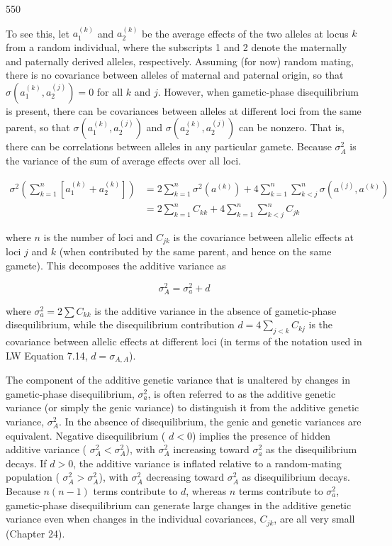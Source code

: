 \documentclass{article}
\begin{document}
550

To see this, let  $ a_1^{(k)} $ and  $ a_2^{(k)} $ be the average effects of the two alleles at locus  $ k $ from a random individual, where the subscripts 1 and 2 denote the maternally and paternally derived alleles, respectively. Assuming (for now) random mating, there is no covariance between alleles of maternal and paternal origin, so that  $ \sigma(a_1^{(k)}, a_2^{(j)}) = 0 $ for all  $ k $ and  $ j $. However, when gametic-phase disequilibrium is present, there can be covariances between alleles at different loci from the same parent, so that  $ \sigma(a_1^{(k)}, a_2^{(j)}) $ and  $ \sigma(a_2^{(k)}, a_2^{(j)}) $ can be nonzero. That is, there can be correlations between alleles in any particular gamete. Because  $ \sigma_A^2 $ is the variance of the sum of average effects over all loci.

\begin{equation}
\begin{align*}\sigma^{2}\left(\sum_{k=1}^{n}\left[a_{1}^{(k)}+a_{2}^{(k)}\right]\right)&=2\sum_{k=1}^{n}\sigma^{2}\left(a^{(k)}\right)+4\sum_{k=1}^{n}\sum_{k<j}^{n}\sigma\left(a^{(j)},a^{(k)}\right)\\&=2\sum_{k=1}^{n}C_{kk}+4\sum_{k=1}^{n}\sum_{k<j}^{n}C_{jk}\end{align*}
\tag{16.1a}
\label{eq:16_1a}
\end{equation}

where $n$ is the number of loci and $C_{jk}$ is the covariance between allelic effects at loci $j$ and $k$ (when contributed by the same parent, and hence on the same gamete). This decomposes the additive variance as

\begin{equation}
\sigma_{A}^{2}=\sigma_{a}^{2}+d
\tag{16.2}
\label{eq:16_2}
\end{equation}

where  $ \sigma_a^2 = 2 \sum C_{kk} $ is the additive variance in the absence of gametic-phase disequilibrium, while the disequilibrium contribution  $ d = 4 \sum_{j < k} C_{kj} $ is the covariance between allelic effects at different loci (in terms of the notation used in LW Equation 7.14,  $ d = \sigma_{A,A} $).

The component of the additive genetic variance that is unaltered by changes in gametic-phase disequilibrium,  $ \sigma_a^2 $, is often referred to as the additive genetic variance (or simply the genic variance) to distinguish it from the additive genetic variance,  $ \sigma_A^2 $. In the absence of disequilibrium, the genic and genetic variances are equivalent. Negative disequilibrium ( $ d < 0 $) implies the presence of hidden additive variance ( $ \sigma_A^2 < \sigma_A^2 $), with  $ \sigma_A^2 $ increasing toward  $ \sigma_a^2 $ as the disequilibrium decays. If  $ d > 0 $, the additive variance is inflated relative to a random-mating population ( $ \sigma_A^2 > \sigma_A^2 $), with  $ \sigma_A^2 $ decreasing toward  $ \sigma_A^2 $ as disequilibrium decays. Because  $ n(n - 1) $ terms contribute to  $ d $, whereas  $ n $ terms contribute to  $ \sigma_a^2 $, gametic-phase disequilibrium can generate large changes in the additive genetic variance even when changes in the individual covariances,  $ C_{jk} $, are all very small (Chapter 24).
\end{document}
